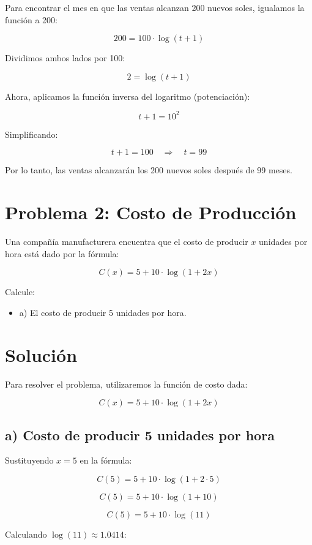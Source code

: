 \documentclass{article}
\begin{document}
Para encontrar el mes en que las ventas alcanzan 200 nuevos soles, igualamos la función a 200:

\[
200 = 100 \cdot \log(t + 1)
\]

Dividimos ambos lados por 100:

\[
2 = \log(t + 1)
\]

Ahora, aplicamos la función inversa del logaritmo (potenciación):

\[
t + 1 = 10^2
\]

Simplificando:

\[
t + 1 = 100 \quad \Rightarrow \quad t = 99
\]

Por lo tanto, las ventas alcanzarán los 200 nuevos soles después de 99 meses.

\section*{Problema 2: Costo de Producción}

Una compañía manufacturera encuentra que el costo de producir \(x\) unidades por hora está dado por la fórmula:

\[
C(x) = 5 + 10 \cdot \log(1 + 2x)
\]

Calcule:

\begin{itemize}
    \item a) El costo de producir 5 unidades por hora.
\end{itemize}

\section*{Solución}

Para resolver el problema, utilizaremos la función de costo dada:

\[
C(x) = 5 + 10 \cdot \log(1 + 2x)
\]

\subsection*{a) Costo de producir 5 unidades por hora}

Sustituyendo \(x = 5\) en la fórmula:

\[
C(5) = 5 + 10 \cdot \log(1 + 2 \cdot 5)
\]

\[
C(5) = 5 + 10 \cdot \log(1 + 10)
\]

\[
C(5) = 5 + 10 \cdot \log(11)
\]

Calculando \(\log(11) \approx 1.0414\):
\end{document}
